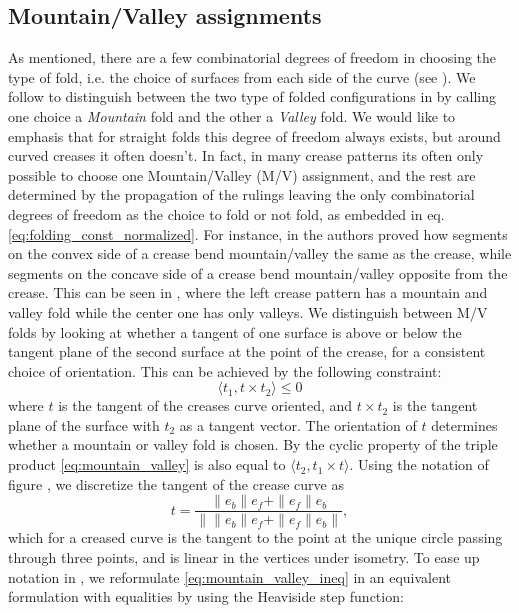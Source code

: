 \subsection{Mountain/Valley assignments} As mentioned, there are a few combinatorial degrees of freedom in choosing the type of fold, i.e. the choice of surfaces from each side of the curve (see ). We follow \cite{demaine_lens} to distinguish between the two type of folded configurations in  by calling one choice a \textit{Mountain} fold and the other a \textit{Valley} fold. We would like to emphasis that for straight folds this degree of freedom always exists, but around curved creases it often doesn't. In fact, in many crease patterns its often only possible to choose one Mountain/Valley (M/V) assignment, and the rest are determined by the propagation of the rulings leaving the only combinatorial degrees of freedom  as the choice to fold or not fold, as embedded in eq. \eqref{eq:folding_const_normalized}. For instance, in \cite{demaine_lens} the authors proved how segments on the convex side of a crease bend mountain/valley the same as the crease, while segments on the concave side of a crease bend mountain/valley opposite from the crease. This can be seen in , where the left crease pattern has a mountain and valley fold while the center one has only valleys.
  We distinguish between M/V folds by looking at whether a tangent of one surface is above or below the tangent plane of the second surface at the point of the crease, for a consistent choice of orientation. This can be achieved by the following constraint:
\begin{equation} \label{eq:mountain_valley_ineq}
\langle t_1, t \times t_2 \rangle \leq 0
\end{equation}
where $t$ is the tangent of the creases curve oriented, and $t \times t_2$ is the tangent plane of the surface with $t_2$ as a tangent vector. The orientation of $t$ determines whether a mountain or valley fold is chosen. By the cyclic property of the triple product \eqref{eq:mountain_valley} is also equal to $\langle t_2, t_1 \times t \rangle$.
Using the notation of figure , we discretize the tangent of the crease curve as 
$$t = \frac{\|e_b\|e_f + \|e_f\|e_b}{\left\|\|e_b\|e_f + \|e_f\|e_b\right\|},$$
%
 which for a creased curve is the tangent to the point at the unique circle passing through three points, and is linear in the vertices under isometry.
To ease up notation in , we reformulate \eqref{eq:mountain_valley_ineq} in an equivalent formulation with equalities by using the Heaviside step function:
